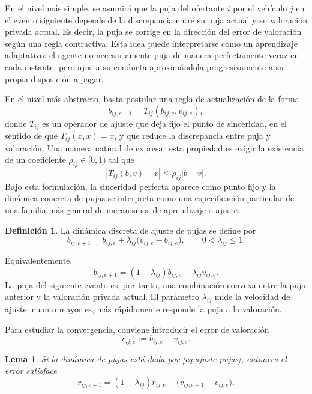 \documentclass[11pt,a4paper]{article}
\newtheorem{lema}{Lema}
\theoremstyle{definition}
\newtheorem{definicion}{Definición}
\begin{document}
En el nivel más simple, se asumirá que la puja del ofertante $i$ por el vehículo $j$ en el evento siguiente depende de la discrepancia entre su puja actual y su valoración privada actual. Es decir, la puja se corrige en la dirección del error de valoración según una regla contractiva. Esta idea puede interpretarse como un aprendizaje adaptativo: el agente no necesariamente puja de manera perfectamente veraz en cada instante, pero ajusta su conducta aproximándola progresivamente a su propia disposición a pagar.

En el nivel más abstracto, basta postular una regla de actualización de la forma
\[
b_{ij,e+1}=T_{ij}(b_{ij,e},v_{ij,e}),
\]
donde $T_{ij}$ es un operador de ajuste que deja fijo el punto de sinceridad, en el sentido de que $T_{ij}(x,x)=x$, y que reduce la discrepancia entre puja y valoración. Una manera natural de expresar esta propiedad es exigir la existencia de un coeficiente $\rho_{ij}\in[0,1)$ tal que
\[
|T_{ij}(b,v)-v|\leq \rho_{ij}|b-v|.
\]
Bajo esta formulación, la sinceridad perfecta aparece como punto fijo y la dinámica concreta de pujas se interpreta como una especificación particular de una familia más general de mecanismos de aprendizaje o ajuste.
\begin{definicion}
La dinámica discreta de ajuste de pujas se define por
\begin{equation}\label{eq:ajuste-pujas}
b_{ij,e+1}=b_{ij,e}+\lambda_{ij}\big(v_{ij,e}-b_{ij,e}\big),
\qquad 0<\lambda_{ij}\leq 1.
\end{equation}
\end{definicion}

Equivalentemente,
\[
b_{ij,e+1}=(1-\lambda_{ij})b_{ij,e}+\lambda_{ij}v_{ij,e}.
\]
La puja del siguiente evento es, por tanto, una combinación convexa entre la puja anterior y la valoración privada actual. El parámetro $\lambda_{ij}$ mide la velocidad de ajuste: cuanto mayor es, más rápidamente responde la puja a la valoración.

Para estudiar la convergencia, conviene introducir el error de valoración
\[
r_{ij,e}:=b_{ij,e}-v_{ij,e}.
\]

\begin{lema}\label{lema:error}
Si la dinámica de pujas está dada por \eqref{eq:ajuste-pujas}, entonces el error satisface
\begin{equation}\label{eq:dinamica-error}
r_{ij,e+1}=(1-\lambda_{ij})r_{ij,e}-\big(v_{ij,e+1}-v_{ij,e}\big).
\end{equation}
\end{lema}
\end{document}
